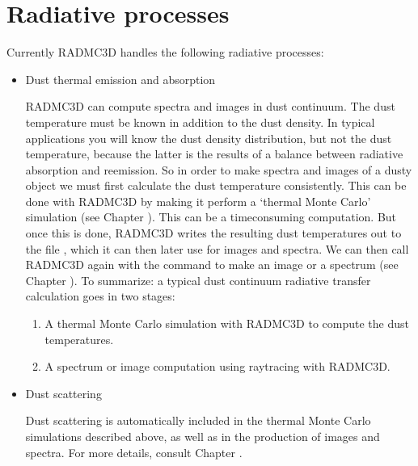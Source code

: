 \documentclass[letterpaper,10pt,english]{sphinxmanual}
\begin{document}
\section{Radiative processes}
\label{\detokenize{basicstructure:radiative-processes}}\label{\detokenize{basicstructure:sec-rad-processes}}
Currently RADMC\sphinxhyphen{}3D handles the following radiative processes:
\begin{itemize}
\item {} 
Dust thermal emission and absorption

RADMC\sphinxhyphen{}3D can compute spectra and images in dust continuum. The dust
temperature must be known in addition to the dust density. In typical
applications you will know the dust density distribution, but not the dust
temperature, because the latter is the results of a balance between
radiative absorption and re\sphinxhyphen{}emission. So in order to make spectra and
images of a dusty object we must first calculate the dust temperature
consistently. This can be done with RADMC\sphinxhyphen{}3D by making it perform a
‘thermal Monte Carlo’ simulation (see Chapter {\hyperref[\detokenize{dustradtrans:chap-dust-transfer}]{}}).
This can be a time\sphinxhyphen{}consuming computation. But once this is done, RADMC\sphinxhyphen{}3D
writes the resulting dust temperatures out to the file
, which it can then later use for images and
spectra. We can then call RADMC\sphinxhyphen{}3D again with the command to make an image
or a spectrum (see Chapter {\hyperref[\detokenize{dustradtrans:chap-dust-transfer}]{}}). To summarize: a
typical dust continuum radiative transfer calculation goes in two stages:
\begin{enumerate}
%
\item {} 
A thermal Monte Carlo simulation with RADMC\sphinxhyphen{}3D to compute the dust
temperatures.

\item {} 
A spectrum or image computation using ray\sphinxhyphen{}tracing with RADMC\sphinxhyphen{}3D.

\end{enumerate}

\item {} 
Dust scattering

Dust scattering is automatically included in the thermal Monte Carlo
simulations described above, as well as in the production of images and
spectra. For more details, consult Chapter {\hyperref[\detokenize{dustradtrans:chap-dust-transfer}]{}}.


\end{itemize}
\end{document}
